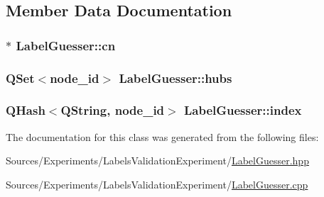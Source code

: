 \subsection{Member Data Documentation}
\hypertarget{class_label_guesser_acdd5ba09b2a6aa6fadc4b64798bd4e75}{
\subsubsection[{cn}]{$\ast$ Label\+Guesser\+::cn\hspace{0.3cm}{\ttfamily [private]}}}\label{class_label_guesser_acdd5ba09b2a6aa6fadc4b64798bd4e75}
\hypertarget{class_label_guesser_a9a1306e306ecf90e6d886a45a1ed16f7}{
\subsubsection[{hubs}]{\setlength{\rightskip}{0pt plus 5cm}Q\+Set$<${\bf node\+\_\+id}$>$ Label\+Guesser\+::hubs\hspace{0.3cm}{\ttfamily [private]}}}\label{class_label_guesser_a9a1306e306ecf90e6d886a45a1ed16f7}
\hypertarget{class_label_guesser_ae88b5f0ad103084c7c8d7326c4bd7251}{
\subsubsection[{index}]{\setlength{\rightskip}{0pt plus 5cm}Q\+Hash$<$Q\+String, {\bf node\+\_\+id}$>$ Label\+Guesser\+::index\hspace{0.3cm}{\ttfamily [private]}}}\label{class_label_guesser_ae88b5f0ad103084c7c8d7326c4bd7251}


The documentation for this class was generated from the following files\+:\begin{DoxyCompactItemize}
\item 
Sources/\+Experiments/\+Labels\+Validation\+Experiment/\hyperlink{_label_guesser_8hpp}{Label\+Guesser.\+hpp}\item 
Sources/\+Experiments/\+Labels\+Validation\+Experiment/\hyperlink{_label_guesser_8cpp}{Label\+Guesser.\+cpp}\end{DoxyCompactItemize}
